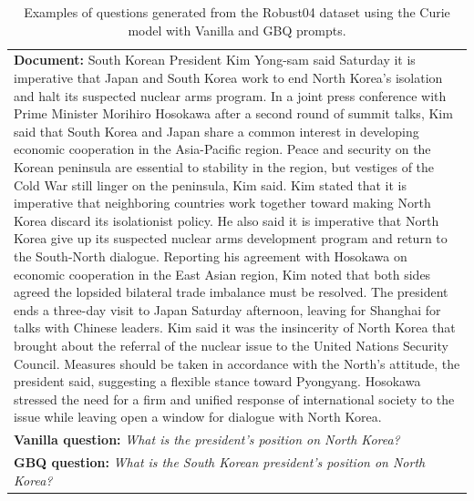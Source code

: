 \documentclass[11pt]{article}
\begin{document}
\begin{table}[htbp!]
 \begin{small}
\setlength\tabcolsep{6pt} %
 \caption{Examples of questions generated from the Robust04 dataset using the Curie model with Vanilla and GBQ prompts.}
 \label{tab:examples_robust04}
\begin{tabularx}{\textwidth}{X}
\toprule
\textbf{\textcolor{blu}{Document:}} {\footnotesize South Korean President Kim Yong-sam said Saturday it is imperative that Japan and South Korea work to end North Korea's isolation and halt its suspected nuclear arms program. In a joint press conference with Prime Minister Morihiro Hosokawa after a second round of summit talks, Kim said that South Korea and Japan share a common interest in developing economic cooperation in the Asia-Pacific region. Peace and security on the Korean peninsula are essential to stability in the region, but vestiges of the Cold War still linger on the peninsula, Kim said. Kim stated that it is imperative that neighboring countries work together toward making North Korea discard its isolationist policy. He also said it is imperative that North Korea give up its suspected nuclear arms development program and return to the South-North dialogue. Reporting his agreement with Hosokawa on economic cooperation in the East Asian region, Kim noted that both sides agreed the lopsided bilateral trade imbalance must be resolved. The president ends a three-day visit to Japan Saturday afternoon, leaving for Shanghai for talks with Chinese leaders. Kim said it was the insincerity of North Korea that brought about the referral of the nuclear issue to the United Nations Security Council. Measures should be taken in accordance with the North's attitude, the president said, suggesting a flexible stance toward Pyongyang. Hosokawa stressed the need for a firm and unified response of international society to the issue while leaving open a window for dialogue with North Korea.}   \\
\textbf{\textcolor{orng}{Vanilla question:}} \textit{What is the president's position on North Korea?}  \\ 
\textbf{\textcolor{rd}{GBQ question:}} \textit{What is the South Korean president's position on North Korea?}  \\
  \midrule

\end{tabularx}
\end{small}
\end{table}
\end{document}

